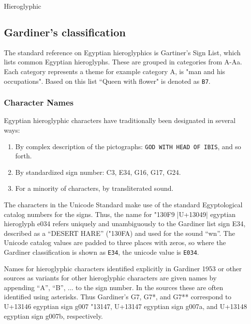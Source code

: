 \begin{scriptexample}[]{Hieroglyphic}
\bgroup
{}
\egroup
\end{scriptexample}

\subsection{Gardiner's classification}

The standard reference on Egyptian hieroglyphics is Gartiner's Sign List, which lists common Egyptian hieroglyphs. These are grouped in categories from A-Aa. Each category represents a theme for example category A, is "man and his occupations". Based on this list ``Queen with flower" is denoted as \texttt{B7}. 

\subsubsection{Character Names} 

Egyptian hieroglyphic characters have traditionally been designated in
several ways:

\begin{enumerate}
\item  By complex description of the pictographs: \texttt{GOD WITH HEAD OF IBIS}, and so forth.
\item By standardized sign number: C3, E34, G16, G17, G24.
\item For a minority of characters, by transliterated sound.
\end{enumerate}

The characters in the Unicode Standard make use of the standard Egyptological catalog
numbers for the signs. Thus, the name for {\hiero\char"130F9} |U+13049| egyptian hieroglyph e034 refers
uniquely and unambiguously to the Gardiner list sign E34, described as a “{\aegean DESERT HARE}” ({\hiero \char"130FA}) and used for the sound “wn”. The Unicode catalog values are padded to three places with
zeros, so where the Gardiner classification is shown as \texttt{E34}, the unicode value is \texttt{E034}. 

Names for hieroglyphic characters identified explicitly in Gardiner 1953 or other sources as
variants for other hieroglyphic characters are given names by appending “A”, “B”, ... to the sign number. In the sources these are often identified using asterisks. Thus Gardiner’s G7,
G7*, and G7** correspond to U+13146 egyptian sign g007 {\hiero \char"13147}, U+13147 egyptian sign g007a, and U+13148 egyptian sign g007b, respectively.

